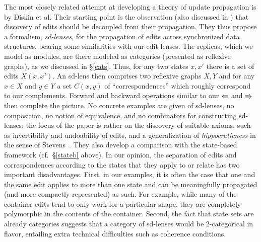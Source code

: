 \documentclass{sigplanconf}
\begin{document}


\label{sec:related}

The most closely related attempt at developing a theory of update
propagation is \cite{Diskin-Delta11} by Diskin et al. Their starting
point is the observation (also discussed in \cite{Matching10}) that discovery of
edits should be decoupled from their propagation. They thus propose a
formalism, \emph{sd-lenses}, for the propagation of edits across
synchronized data structures, bearing some similarities with our
edit lenses. The replicas, which we model as modules, are there modeled
as categories (presented as reflexive graphs)\iffull, as we discussed in 
\S \ref{cats}\fi. Thus, for any two states $x,x'$ there is a set of
edits $X(x,x')$. An sd-lens then comprises two reflexive graphs $X,Y$
and for any $x\in X$ and $y\in Y$ a set $C(x,y)$ of
``correspondences'' which roughly correspond to our
complements. Forward and backward operations similar to our $\mathord{\Lleftarrow}$ and
$\mathord{\Rrightarrow}$ then complete the picture. No concrete
examples are given of sd-lenses, no composition, no notion of equivalence, and
no combinators for constructing sd-lenses; the focus of the paper is
rather on the discovery of suitable axioms, such as invertibility and
undoability of edits, and a 
generalization of {\em hippocraticness} in the sense of
Stevens~\cite{Stevens07}. They also develop a comparison 
with the state-based framework (cf.\ \S \ref{stateb} above). In
our opinion, the separation of edits and correspondences according to
the states that they apply to or relate has two important
disadvantages.  First, in our examples, it is often the case that one
and the same edit applies to more than one state and can be
meaningfully propagated (and more compactly represented) as such. For example, while many of the
container edits tend to only work for a particular shape, they are
completely polymorphic in the contents of the container. Second, the
fact that state sets are already categories suggests 
that a category of sd-lenses would be
2-categorical in flavor, entailing extra technical difficulties such as
coherence conditions. 
\end{document}
